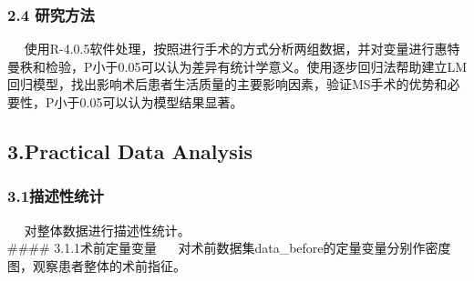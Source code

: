 \documentclass[
]{article}
\newenvironment{Shaded}{\begin{snugshade}}{\end{snugshade}}
\newcommand{\CommentTok}[1]{\textcolor[rgb]{0.56,0.35,0.01}{\textit{#1}}}
\newcommand{\FunctionTok}[1]{\textcolor[rgb]{0.00,0.00,0.00}{#1}}
\newcommand{\NormalTok}[1]{#1}
\newcommand{\OtherTok}[1]{\textcolor[rgb]{0.56,0.35,0.01}{#1}}
\newcommand{\SpecialCharTok}[1]{\textcolor[rgb]{0.00,0.00,0.00}{#1}}
\newcommand{\StringTok}[1]{\textcolor[rgb]{0.31,0.60,0.02}{#1}}
\begin{document}
\begin{Shaded}
\end{Shaded}

\hypertarget{ux7814ux7a76ux65b9ux6cd5}{%
\subsubsection{2.4 研究方法}\label{ux7814ux7a76ux65b9ux6cd5}}

 
使用R-4.0.5软件处理，按照进行手术的方式分析两组数据，并对变量进行惠特曼秩和检验，P小于0.05可以认为差异有统计学意义。使用逐步回归法帮助建立LM回归模型，找出影响术后患者生活质量的主要影响因素，验证MS手术的优势和必要性，P小于0.05可以认为模型结果显著。

\hypertarget{practical-data-analysis}{%
\subsection{3.Practical Data Analysis}\label{practical-data-analysis}}

\hypertarget{ux63cfux8ff0ux6027ux7edfux8ba1}{%
\subsubsection{3.1描述性统计}\label{ux63cfux8ff0ux6027ux7edfux8ba1}}

  对整体数据进行描述性统计。\\
\#\#\#\# 3.1.1术前定量变量  
对术前数据集data\_before的定量变量分别作密度图，观察患者整体的术前指征。
\end{document}
